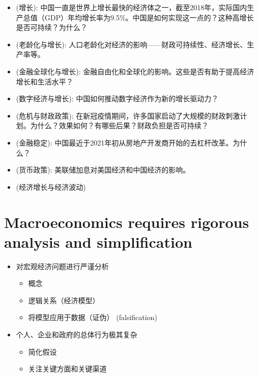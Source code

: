 \documentclass[lang=cn,10pt,green]{elegantbook}
\begin{document}
\begin{itemize}
    \item (增长): 中国一直是世界上增长最快的经济体之一，截至2018年，实际国内生产总值（GDP）年均增长率为9.5\%。中国是如何实现这一点的？这种高增长是否可持续？为什么？
    \item (老龄化与增长): 人口老龄化对经济的影响——财政可持续性、经济增长、生产率等。
    \item (金融全球化与增长): 金融自由化和全球化的影响。这些是否有助于提高经济增长和生活水平？
    \item (数字经济与增长): 中国如何推动数字经济作为新的增长驱动力？
    \item (危机与财政政策): 在新冠疫情期间，许多国家启动了大规模的财政刺激计划。为什么？效果如何？有哪些后果？财政负担是否可持续？
    \item (金融稳定): 中国最近于2021年初从房地产开发商开始的去杠杆改革。为什么？
    \item (货币政策): 美联储加息对美国经济和中国经济的影响。
    \item (经济增长与经济波动)
\end{itemize}

\section{Macroeconomics requires rigorous analysis and simplification}
\begin{itemize}
    \item 对宏观经济问题进行严谨分析
    \begin{itemize}
        \item 概念
        \item 逻辑关系（经济模型）
        \item 将模型应用于数据（证伪） (falsification)
    \end{itemize}
    \item 个人、企业和政府的总体行为极其复杂
    \begin{itemize}
        \item 简化假设
        \item 关注关键方面和关键渠道
    \end{itemize}
\end{itemize}
\end{document}
